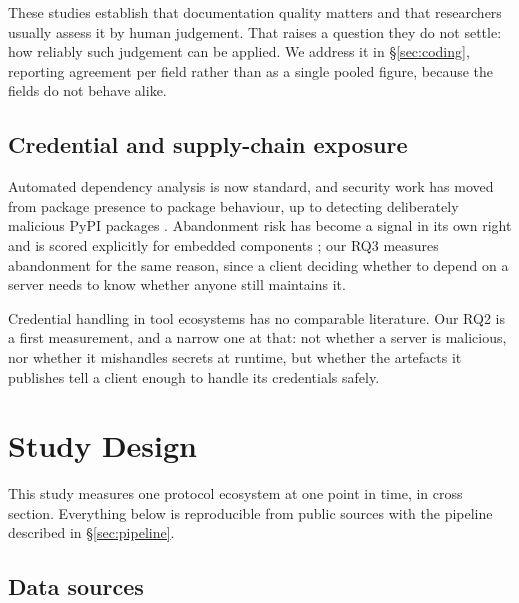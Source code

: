 \documentclass[a4paper,fleqn]{cas-dc}
\begin{document}
These studies establish that documentation quality matters and that researchers
usually assess it by human judgement. That raises a question they do not
settle: how reliably such judgement can be applied. We address it in
\S\ref{sec:coding}, reporting agreement per field rather than as a single
pooled figure, because the fields do not behave alike.

\subsection{Credential and supply-chain exposure}

Automated dependency analysis is now standard, and security work has moved from
package presence to package behaviour, up to detecting deliberately malicious
PyPI packages \citep{maliciouspypi2026}. Abandonment risk has become a signal
in its own right and is scored explicitly for embedded components
\citep{li2022ossara}; our RQ3 measures abandonment for the same reason, since a
client deciding whether to depend on a server needs to know whether anyone
still maintains it.

Credential handling in tool ecosystems has no comparable literature. Our RQ2 is
a first measurement, and a narrow one at that: not whether a server is
malicious, nor whether it mishandles secrets at runtime, but whether the
artefacts it publishes tell a client enough to handle its credentials safely.

\section{Study Design}\label{sec:design}

This study measures one protocol ecosystem at one point in time, in cross
section. Everything below is reproducible from public sources with the
pipeline described in \S\ref{sec:pipeline}.

\subsection{Data sources}
\end{document}
